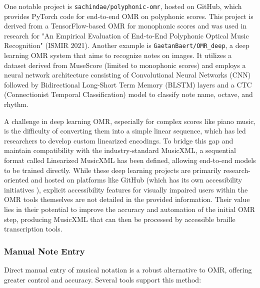 One notable project is \texttt{sachindae/polyphonic-omr}, hosted on GitHub, which provides PyTorch code for end-to-end OMR on polyphonic scores. \cite{sachindae-polyphonic-omr} This project is derived from a TensorFlow-based OMR for monophonic scores and was used in research for "An Empirical Evaluation of End-to-End Polyphonic Optical Music Recognition" (ISMIR 2021). \cite{sachindae-polyphonic-omr} Another example is \texttt{GaetanBaert/OMR\_deep}, a deep learning OMR system that aims to recognize notes on images. \cite{gaetanbaert-omrdeep} It utilizes a dataset derived from MuseScore (limited to monophonic scores) and employs a neural network architecture consisting of Convolutional Neural Networks (CNN) followed by Bidirectional Long-Short Term Memory (BLSTM) layers and a CTC (Connectionist Temporal Classification) model to classify note name, octave, and rhythm. \cite{gaetanbaert-omrdeep}

A challenge in deep learning OMR, especially for complex scores like piano music, is the difficulty of converting them into a simple linear sequence, which has led researchers to develop custom linearized encodings. \cite{researchgate-linearized-musicxml} To bridge this gap and maintain compatibility with the industry-standard MusicXML, a sequential format called Linearized MusicXML has been defined, allowing end-to-end models to be trained directly. \cite{researchgate-linearized-musicxml} While these deep learning projects are primarily research-oriented and hosted on platforms like GitHub (which has its own accessibility initiatives \cite{github-accessibility}), explicit accessibility features for visually impaired users within the OMR tools themselves are not detailed in the provided information. Their value lies in their potential to improve the accuracy and automation of the initial OMR step, producing MusicXML that can then be processed by accessible braille transcription tools.

\subsubsection{Manual Note Entry}
Direct manual entry of musical notation is a robust alternative to OMR, offering greater control and accuracy. Several tools support this method:

